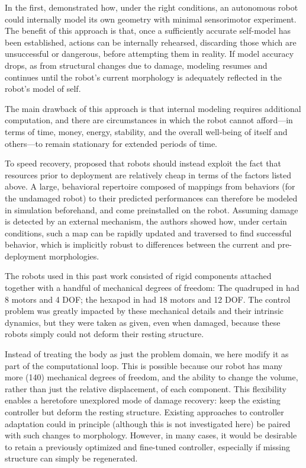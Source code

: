 In the first, \citet{bongard2006resilient} demonstrated how, under the right conditions, an autonomous robot could internally model its own geometry with minimal sensorimotor experiment.
The benefit of this approach is that, once a sufficiently accurate self-model has been established, actions can be internally rehearsed, discarding those which are unsuccessful or dangerous, before attempting them in reality.
If model accuracy drops, as from structural changes due to damage, modeling resumes and continues until the robot's current morphology is adequately reflected in the robot's model of self.

The main drawback of this approach is that internal modeling requires additional computation, and there are circumstances in which the robot cannot afford---in terms of time, money, energy, stability, and the overall well-being of itself and others---to remain stationary for extended periods of time.

To speed recovery, \citet{cully2015robots} proposed that robots should instead exploit the fact that resources prior to deployment are relatively cheap in terms of the factors listed above.
A large, behavioral repertoire composed of mappings from behaviors (for the undamaged robot) to their predicted performances can therefore be modeled in simulation beforehand, and come preinstalled on the robot.
Assuming damage is detected by an external mechanism, the authors showed how, under certain conditions, such a map can be rapidly updated and traversed to find successful behavior, 
which is 
implicitly robust to differences between the current and pre-deployment
morphologies.



The robots used in this past work consisted of rigid components attached together with a handful of mechanical degrees of freedom:
The quadruped in \cite{bongard2006resilient} had 8 motors and 4 DOF; 
the hexapod in \cite{cully2015robots} had 18 motors and 12 DOF.
The control problem was greatly impacted by these mechanical details and their intrinsic dynamics, but they were taken as given, even when damaged, because these robots simply could not deform their resting structure.


Instead of treating the body as just the problem domain, we here modify it as part of the computational loop.
This is possible because our robot has many more (140) mechanical degrees of freedom, and the ability to change the volume, rather than just the relative displacement, of each component.
This flexibility enables a heretofore unexplored mode of damage recovery: keep the existing controller but deform the resting structure.
Existing approaches to controller adaptation could in principle (although this is not investigated here) be paired with such changes to morphology.
However, in many cases, it would be desirable to retain a previously optimized and fine-tuned controller, especially if missing structure can simply be regenerated.

